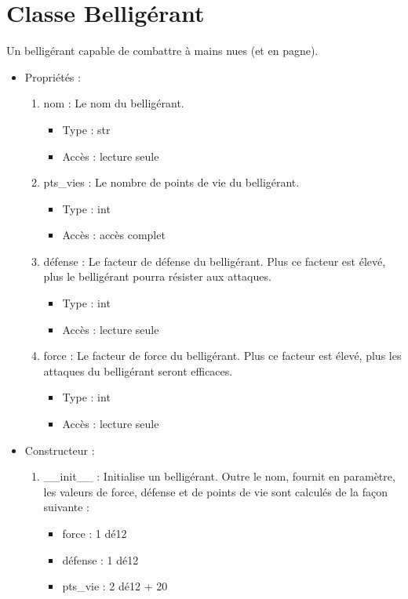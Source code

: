 \documentclass[12pt,pdftex,oneside]{article}
\begin{document}
  \section {Classe Belligérant}

  Un belligérant capable de combattre à mains nues (et en pagne).

  \begin{itemize}
  \item Propriétés : 
    \begin{enumerate}
    \item nom : Le nom du belligérant.
          \begin{itemize}
          \item Type : str
          \item Accès : lecture seule
          \end{itemize}
    \item pts\_vies : Le nombre de points de vie du belligérant.
          \begin{itemize}
          \item Type : int
          \item Accès : accès complet
          \end{itemize}
    \item défense : Le facteur de défense du belligérant. Plus ce facteur est
      élevé, plus le belligérant pourra résister aux attaques.
          \begin{itemize}
          \item Type : int
          \item Accès : lecture seule
          \end{itemize}
    \item force : Le facteur de force du belligérant. Plus ce facteur est
      élevé, plus les attaques du belligérant seront efficaces.
          \begin{itemize}
          \item Type : int
          \item Accès : lecture seule
          \end{itemize}

    \end{enumerate}

  \item Constructeur : 

    \begin{enumerate}
    \item \_\_init\_\_ : Initialise un belligérant. Outre le nom, fournit en
paramètre, les valeurs de force, défense et de points de vie sont calculés de la
façon suivante :
        \begin{itemize}
          \item force : 1 dé12
          \item défense : 1 dé12
          \item pts\_vie : 2 dé12 + 20
        \end{itemize}
    \end{enumerate}


\end{itemize}
\end{document}
